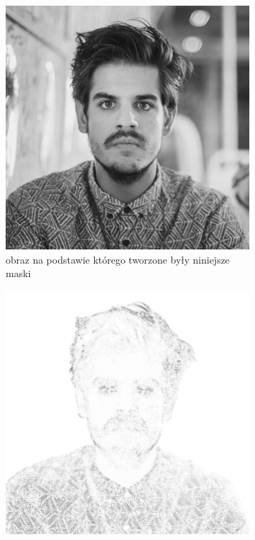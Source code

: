 \documentclass[a4paper, 12pt, polish, twoside]{extreport}
\begin{document}
    \begin{figure}[H] 
    \centering
    \begin{subfigure}{0.32\textwidth}
        \centering
        \includegraphics[width = \textwidth]{img/4-mine/taco-mask/taco-grey.png}
        \caption{obraz na podstawie którego tworzone były niniejsze maski}
        \label{mine-param-taco-a}
    \end{subfigure}
    \begin{subfigure}{0.32\textwidth}
        \centering
        \includegraphics[width = \textwidth]{img/4-mine/taco-mask/taco_mask_c20_inv0_bg1_obj1_ed1.png}

\end{subfigure}
\end{figure}
\end{document}
